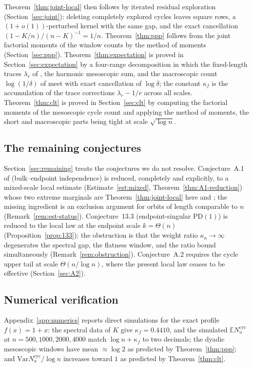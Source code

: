 \documentclass[11pt]{article}
\newcommand{\E}{\mathbb{E}}
\newcommand{\1}{\mathbf{1}}
\newcommand{\Var}{\mathrm{Var}}
\newcommand{\cyc}{\mathrm{cyc}}
\newcommand{\PD}{\mathrm{PD}}
\theoremstyle{remark}
\begin{document}
Theorem~\ref{thm:joint-local} then follows by iterated residual
exploration (Section~\ref{sec:joint}): deleting completely explored
cycles leaves square rows, a $(1+o(1))$-perturbed kernel with the same
gap, and the exact cancellation $(1-K/n)/(n-K)^{-1}=1/n$.
Theorem~\ref{thm:ppp} follows from the joint factorial moments of the
window counts by the method of moments (Section~\ref{sec:ppp}).
Theorem~\ref{thm:expectation} is proved in
Section~\ref{sec:expectation} by a four-range decomposition in which
the fixed-length traces $\lambda_r$ of \cite[Theorem~5.1]{Lon26}, the
harmonic mesoscopic sum, and the macroscopic count
$\log(1/\delta)$ of \cite[Proposition~6.14]{Lon26} meet with exact
cancellation of $\log\delta$; the constant $\kappa_f$ is the
accumulation of the trace corrections $\lambda_r-1/r$ across all
scales. Theorem~\ref{thm:clt} is proved in Section~\ref{sec:clt} by
computing the factorial moments of the mesoscopic cycle count and
applying the method of moments, the short and macroscopic parts being
tight at scale $\sqrt{\log n}$.

\subsection{The remaining conjectures}
Section~\ref{sec:remaining} treats the conjectures we do not resolve.
Conjecture~A.1 of \cite{Lon26} (bulk--endpoint independence) is
reduced, completely and explicitly, to a mixed-scale local estimate
(Estimate~\ref{est:mixed}, Theorem~\ref{thm:A1-reduction}) whose two
extreme marginals are Theorem~\ref{thm:joint-local} here and
\cite[Theorem~10.1]{Lon26}; the missing ingredient is an exclusion
argument for orbits of length comparable to $n$
(Remark~\ref{rem:est-status}). Conjecture~13.3 (endpoint-singular
$\PD(1)$) is reduced to the local law at the endpoint scale
$k=\Theta(n)$ (Proposition~\ref{prop:133}); the obstruction is that
the weight ratio $\kappa_n\to\infty$ degenerates the spectral gap, the
flatness window, and the ratio bound simultaneously
(Remark~\ref{rem:obstruction}). Conjecture~A.2 requires the cycle
upper tail at scale $\Theta(n/\log n)$, where the present local law
ceases to be effective (Section~\ref{sec:A2}).

\subsection{Numerical verification}
Appendix~\ref{app:numerics} reports direct simulations for the exact
profile $f(x)=1+x$: the spectral data of $K$ give
$\kappa_f=0.4410$, and the simulated $\E N_n^{\cyc}$ at
$n=500,1000,2000,4000$ match $\log n+\kappa_f$ to two decimals; the
dyadic mesoscopic windows have mean $\approx\log2$ as predicted by
Theorem~\ref{thm:ppp}; and $\Var N_n^{\cyc}/\log n$ increases toward
$1$ as predicted by Theorem~\ref{thm:clt}.
\end{document}
